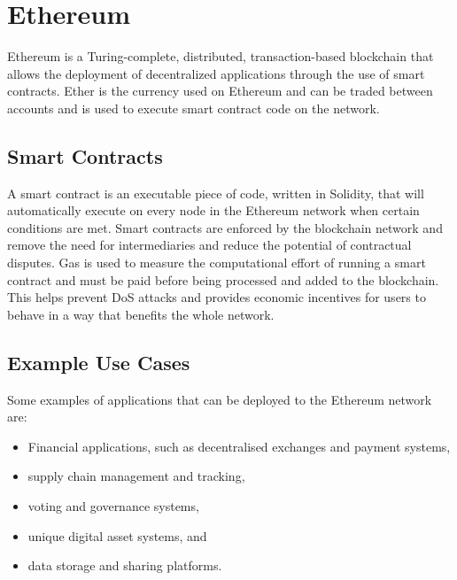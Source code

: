 
\section{Ethereum}

Ethereum is a Turing-complete, distributed, transaction-based blockchain that allows the deployment of decentralized applications through the use of smart contracts. Ether is the currency used on Ethereum and can be traded between accounts and is used to execute smart contract code on the network. 

\subsection*{Smart Contracts}

A smart contract is an executable piece of code, written in Solidity, that will automatically execute on every node in the Ethereum network when certain conditions are met. Smart contracts are enforced by the blockchain network and remove the need for intermediaries and reduce the potential of contractual disputes.
\x
Gas is used to measure the computational effort of running a smart contract and must be paid before being processed and added to the blockchain. This helps prevent DoS attacks and provides economic incentives for users to behave in a way that benefits the whole network.

\subsection*{Example Use Cases}

Some examples of applications that can be deployed to the Ethereum network are:

\begin{itemize}
  \item Financial applications, such as decentralised exchanges and payment systems,
  \item supply chain management and tracking,
  \item voting and governance systems,
  \item unique digital asset systems, and
  \item data storage and sharing platforms.
\end{itemize}